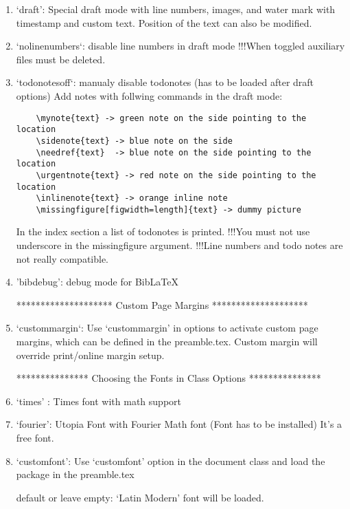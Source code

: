 \begin{enumerate}
\item`draft': Special draft mode with line numbers, images, and water mark
 with timestamp and custom text. Position of the text can also be modified.

\item`nolinenumbers`: disable line numbers in draft mode
 !!!When toggled auxiliary files must be deleted.

\item`todonotesoff`: manualy disable todonotes (has to be loaded after draft options)
 Add notes with follwing commands in the draft mode:
 \begin{verbatim}
	\mynote{text} -> green note on the side pointing to the location
	\sidenote{text} -> blue note on the side
	\needref{text}	-> blue note on the side pointing to the location
	\urgentnote{text} -> red note on the side pointing to the location
	\inlinenote{text} -> orange inline note
	\missingfigure[figwidth=length]{text} -> dummy picture
 \end{verbatim}
 In the index section a list of todonotes is printed.
 !!!You must not use underscore in the missingfigure argument.
 !!!Line numbers and todo notes are not really compatible.

\item'bibdebug': debug mode for BibLaTeX

\begin{center}
	******************** Custom Page Margins ********************
\end{center}
\item`custommargin`: Use `custommargin' in options to activate custom page margins,
 which can be defined in the preamble.tex. Custom margin will override
 print/online margin setup.

\begin{center}
	*************** Choosing the Fonts in Class Options ***************
\end{center}
\item`times' : Times font with math support

\item`fourier': Utopia Font with Fourier Math font (Font has to be installed)
            It's a free font.

\item`customfont': Use `customfont' option in the document class and load the
 package in the preamble.tex

 default or leave empty: `Latin Modern' font will be loaded.


\end{enumerate}
